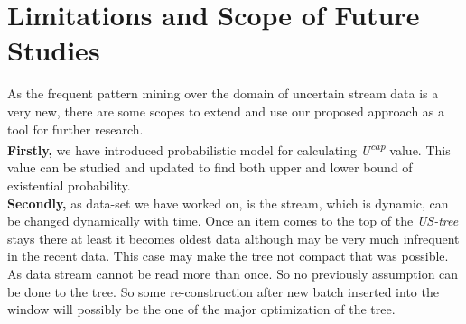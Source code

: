 \section{Limitations and Scope of Future Studies}
As the frequent pattern mining over the domain of uncertain stream data is a very new, there are some scopes to extend and use our proposed approach as a tool for further research.\\ 
\textbf{Firstly,} we have introduced probabilistic model for calculating \emph{U\textsuperscript{cap}} value. This value can be studied and updated to find both upper and lower bound of existential probability.\\
\textbf{Secondly,} as data-set we have worked on, is the stream, which is dynamic, can be changed dynamically with time. Once an item comes to the top of the \emph{US-tree} stays there at least it becomes oldest data although may be very much infrequent in the recent data. This case may make the tree not compact that was possible. As data stream cannot be read more than once. So no previously assumption can be done to the tree. So some re-construction after new batch inserted into the window will possibly be the one of the major optimization of the tree.